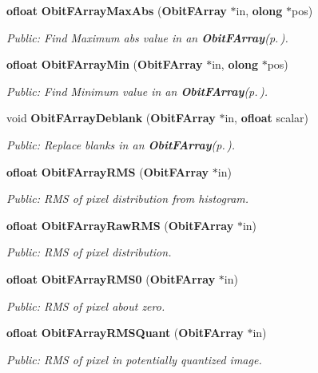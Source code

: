 \begin{CompactItemize}
{\bf ofloat} {\bf Obit\-FArray\-Max\-Abs} ({\bf Obit\-FArray} $\ast$in, {\bf olong} $\ast$pos)
\begin{CompactList}\small\item\em Public: Find Maximum abs value in an {\bf Obit\-FArray}{\rm (p.\,\pageref{structObitFArray})}. \item\end{CompactList}\item 
{\bf ofloat} {\bf Obit\-FArray\-Min} ({\bf Obit\-FArray} $\ast$in, {\bf olong} $\ast$pos)
\begin{CompactList}\small\item\em Public: Find Minimum value in an {\bf Obit\-FArray}{\rm (p.\,\pageref{structObitFArray})}. \item\end{CompactList}\item 
void {\bf Obit\-FArray\-Deblank} ({\bf Obit\-FArray} $\ast$in, {\bf ofloat} scalar)
\begin{CompactList}\small\item\em Public: Replace blanks in an {\bf Obit\-FArray}{\rm (p.\,\pageref{structObitFArray})}. \item\end{CompactList}\item 
{\bf ofloat} {\bf Obit\-FArray\-RMS} ({\bf Obit\-FArray} $\ast$in)
\begin{CompactList}\small\item\em Public: RMS of pixel distribution from histogram. \item\end{CompactList}\item 
{\bf ofloat} {\bf Obit\-FArray\-Raw\-RMS} ({\bf Obit\-FArray} $\ast$in)
\begin{CompactList}\small\item\em Public: RMS of pixel distribution. \item\end{CompactList}\item 
{\bf ofloat} {\bf Obit\-FArray\-RMS0} ({\bf Obit\-FArray} $\ast$in)
\begin{CompactList}\small\item\em Public: RMS of pixel about zero. \item\end{CompactList}\item 
{\bf ofloat} {\bf Obit\-FArray\-RMSQuant} ({\bf Obit\-FArray} $\ast$in)
\begin{CompactList}\small\item\em Public: RMS of pixel in potentially quantized image. \item\end{CompactList}\item 

\end{CompactItemize}
